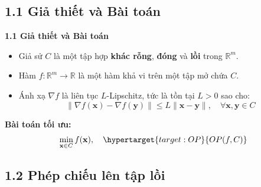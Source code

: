 \subsection{1.1 Giả thiết và Bài toán}

\begin{frame}[t]{\textbf{\large 1.1 Giả thiết và Bài toán}}
    \vspace*{-1cm}
    \begin{itemize}
        \item Giả sử $C$ là một tập hợp \textbf{khác rỗng}, \textbf{đóng} và \textbf{lồi} trong $\mathbb{R}^m$.
        \item Hàm $f : \mathbb{R}^m \to \mathbb{R}$ là một hàm khả vi trên một tập mở chứa $C$.
        \item Ánh xạ $\nabla f$ là liên tục $L$-Lipschitz, tức là tồn tại $L > 0$ sao cho:
        \[
            \|\nabla f (\mathbf{x}) - \nabla f (\mathbf{y})\| \le L\|\mathbf{x} - \mathbf{y}\|, \quad \forall \mathbf{x}, \mathbf{y} \in C
        \]
    \end{itemize}

    \pause
    \vspace{0.5cm} 
    
    \textbf{Bài toán tối ưu:}
    \[
        \min_{\mathbf{x} \in C} f(\mathbf{x}), \quad \hypertarget{target:OP}{OP(f,C)}
    \]
\end{frame}

\subsection{1.2 Phép chiếu lên tập lồi}


